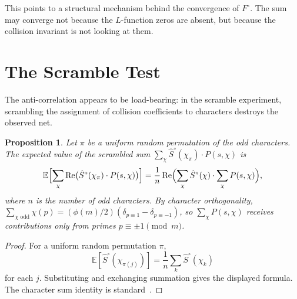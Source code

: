 \documentclass[12pt]{amsart}
\newtheorem{proposition}[theorem]{Proposition}
\theoremstyle{definition}
\theoremstyle{remark}
\begin{document}
This points to a structural mechanism behind the
convergence of $F^{\circ}$. The sum may converge not
because the $L$-function zeros are absent, but
because the collision invariant is not looking at
them.

\section{The Scramble Test}

The anti-correlation appears to be load-bearing: in
the scramble experiment, scrambling the assignment of
collision coefficients to characters destroys the
observed net.

\begin{proposition}\label{prop:scramble}
Let $\pi$ be a uniform random permutation of the odd
characters. The expected value of the scrambled sum
$\sum_{\chi} \hat{S}^{\circ}(\chi_{\pi}) \cdot
P(s, \chi)$ is
\[
\mathbb{E}\Bigl[\sum_{\chi}
\operatorname{Re}\bigl(\hat{S}^{\circ}(\chi_{\pi})
\cdot P(s, \chi)\bigr)\Bigr]
= \frac{1}{n}\operatorname{Re}\Bigl(
\sum_{\chi} \hat{S}^{\circ}(\chi) \cdot
\sum_{\chi} P(s, \chi)\Bigr),
\]
where $n$ is the number of odd characters. By
character orthogonality,
$\sum_{\chi \text{ odd}} \chi(p) =
(\phi(m)/2)(\delta_{p \equiv 1} -
\delta_{p \equiv -1})$, so
$\sum_{\chi} P(s, \chi)$ receives contributions only
from primes $p \equiv \pm 1 \pmod{m}$.
\end{proposition}

\begin{proof}
For a uniform random permutation $\pi$,
\[
\mathbb{E}[\hat{S}^{\circ}(\chi_{\pi(j)})]
= \frac{1}{n} \sum_{k} \hat{S}^{\circ}(\chi_k)
\]
for each $j$. Substituting and exchanging summation
gives the displayed formula. The character sum
identity is standard~\cite{iwaniec}.
\end{proof}
\end{document}
